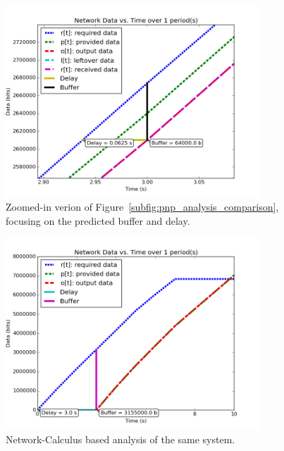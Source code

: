 \begin{figure}[ht!]
  \centering
  \includegraphics[width=0.85\textwidth]{../doc/src/images/results/maren_namek_data_zoom.png}
  \caption{Zoomed-in verion of
    Figure~\ref{subfig:pnp_analysis_comparison}, focusing on the
    predicted buffer and delay.}
  \label{fig:zoom_pnp}
\end{figure}

\begin{figure}[ht!]
  \centering
  \includegraphics[width=0.85\textwidth]{../doc/src/images/results/nc_namek_data.png}
  \caption{Network-Calculus based analysis of the same system.}
  \label{fig:nc_comparison}
\end{figure}

